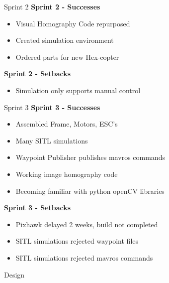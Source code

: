 \documentclass[11pt]{beamer}
\begin{document}
 
 \begin{frame}{Sprint 2}
	\large{\textbf{Sprint 2 - Successes}}
	\begin{itemize}
		\item Visual Homography Code repurposed
		\item Created simulation environment
		\item Ordered parts for new Hex-copter
	\end{itemize}
	\large{\textbf{Sprint 2 - Setbacks}}
	\begin{itemize}
		\item Simulation only supports manual control
	\end{itemize}
 \end{frame}
 
 
 \begin{frame}{Sprint 3}
	\large{\textbf{Sprint 3 - Successes}}
	\begin{itemize}
		\item Assembled Frame, Motors, ESC's
		\item Many SITL simulations
		\item Waypoint Publisher publishes mavros commands
		\item Working image homography code
		\item Becoming familiar with python openCV libraries
	\end{itemize}
	\large{\textbf{Sprint 3 - Setbacks}}
	\begin{itemize}
		\item Pixhawk delayed 2 weeks, build not completed
		\item SITL simulations rejected waypoint files
		\item SITL simulations rejected mavros commands
	\end{itemize}
 \end{frame}



\begin{frame}{Design}
\end{frame}
\end{document}
